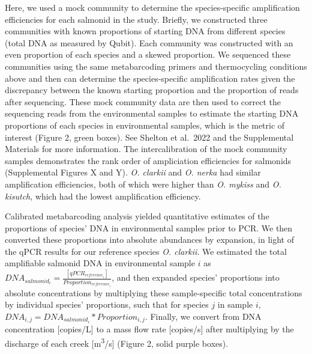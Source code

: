 \documentclass[
]{article}
\begin{document}
Here, we used a mock community to determine the species-specific
amplification efficiencies for each salmonid in the study. Briefly, we
constructed three communities with known proportions of starting DNA
from different species (total DNA as measured by Qubit). Each community
was constructed with an even proportion of each species and a skewed
proportion. We sequenced these communities using the same metabarcoding
primers and thermocycling conditions above and then can determine the
species-specific amplification rates given the discrepancy between the
known starting proportion and the proportion of reads after sequencing.
These mock community data are then used to correct the sequencing reads
from the environmental samples to estimate the starting DNA proportions
of each species in environmental samples, which is the metric of
interest (Figure 2, green boxes). See Shelton et al.~2022 and the
Supplemental Materials for more information. The intercalibration of the
mock community samples demonstrates the rank order of ampliciation
efficiencies for salmonids (Supplemental Figures X and Y). \emph{O.
clarkii} and \emph{O. nerka} had similar amplification efficiencies,
both of which were higher than \emph{O. mykiss} and \emph{O. kisutch},
which had the lowest amplification efficiency.

Calibrated metabarcoding analysis yielded quantitative estimates of the
proportions of species' DNA in environmental samples prior to PCR. We
then converted these proportions into absolute abundances by expansion,
in light of the qPCR results for our reference species \emph{O.
clarkii}. We estimated the total amplifiable salmonid DNA in
environmental sample \(i\) as
\(DNA_{salmonid_{i}} = \frac{[qPCR_{reference_{i}}]}{Proportion_{reference_{i}}}\),
and then expanded species' proportions into absolute concentrations by
multiplying these sample-specific total concentrations by individual
species' proportions, such that for species \(j\) in sample \(i\),
\(DNA_{i,j} = DNA_{salmonid_{i}} * Proportion_{i,j}\). Finally, we
convert from DNA concentration {[}copies/L{]} to a mass flow rate
{[}copies/s{]} after multiplying by the discharge of each creek
{[}m\textsuperscript{3}/s{]} (Figure 2, solid purple boxes).
\end{document}
